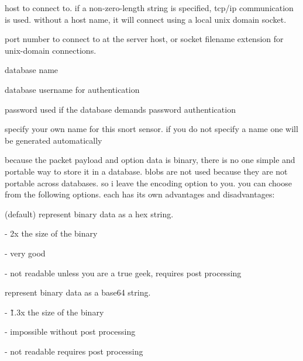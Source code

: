 \documentclass[english]{report}
\begin{document}
\begin{description}{}
\item [host] host to connect to. if a non-zero-length string is specified, tcp/ip communication is used. without a host name, it will connect using a local unix domain socket.
\item [port] port number to connect to at the server host, or socket filename extension for unix-domain connections. 
\item [dbname] database name 
\item [user] database username for authentication
\item [password] password used if the database demands password authentication
\item [sensor\_name] specify your own name for this snort sensor. if you do not specify a name one will be generated automatically
\item [encoding] because the packet payload and option data is binary, there is no one simple and portable way to store it in a database. blobs are not used because they are not portable across databases. so i leave the encoding option to you. you can choose from the following options. each has its own advantages and disadvantages:

   \begin{description}{}
       \item [hex](default) represent binary data as a hex string. 

       \begin{description}{}
             \item [storage~requirements]- 2x the size of the binary
             \item [searchability]- very good 
             \item [human~readability]- not readable unless you are a true geek, requires post processing
       \end{description}
       \item [base64]represent binary data as a base64 string. 

      \begin{description}{}
            \item [storage~requirements]- \~1.3x the size of the binary 
            \item [searchability]- impossible without post processing 
            \item [human~readability]- not readable requires post processing
      \end{description}


\end{description}
\end{description}
\end{document}
